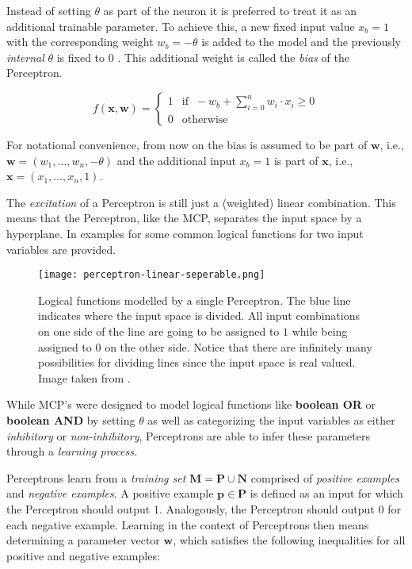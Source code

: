 Instead of setting $\theta$ as part of the neuron it is preferred to treat it as an additional trainable parameter.
To achieve this, a new fixed input value $x_b = 1$ with the corresponding weight $w_b = -\theta$ is added to the model and the previously \emph{internal} $\theta$ is fixed to $0$ .
This additional weight is called the \textit{bias} of the Perceptron.

\begin{equation}
    \label{eq:full-perceptron}
    f(\bm{x}, \bm{w}) =
    \begin{cases}
        1 & \text{if } ~ -w_b + \sum_{i=0}^n w_i \cdot x_i \geq 0 \\
        0 & \text{otherwise}
    \end{cases}
\end{equation}

For notational convenience, from now on the bias is assumed to be part of $\bm{w}$, i.e., $\bm{w} = (w_1, \dots, w_n, -\theta)$ and the additional input $x_b = 1$ is part of $\bm{x}$, i.e., $\bm{x} = (x_1, \dots, x_n, 1)$.

The \textit{excitation} of a Perceptron is still just a (weighted) linear combination.
This means that the Perceptron, like the MCP, separates the input space by a hyperplane.
In  examples for some common logical functions for two input variables are provided.

\begin{figure}[htb!]
    \texttt{[image: perceptron-linear-seperable.png]}
    \caption{Logical functions modelled by a single Perceptron. The blue line indicates where the input space is divided. All input combinations on one side of the line are going to be assigned to $1$ while being assigned to $0$ on the other side. Notice that there are infinitely many possibilities for dividing lines since the input space is real valued. Image taken from \cite{rudolph_lecture_2018}.}
    \label{fig:perceptron-logic}
\end{figure}

While MCP's were designed to model logical functions like \textbf{boolean OR} or \textbf{boolean AND} by setting $\theta$ as well as categorizing the input variables as either \textit{inhibitory} or \textit{non-inhibitory}, Perceptrons are able to infer these parameters through a \textit{learning process}.

Perceptrons learn from a \textit{training set} $\bm{M} = \bm{P} \cup \bm{N}$ comprised of \textit{positive examples} and \textit{negative examples}.
A positive example $\bm{p} \in \bm{P}$ is defined as an input for which the Perceptron should output $1$.
Analogously, the Perceptron should output $0$ for each negative example.
Learning in the context of Perceptrons then means determining a parameter vector $\bm{w}$, which satisfies the following inequalities for all positive and negative examples:

